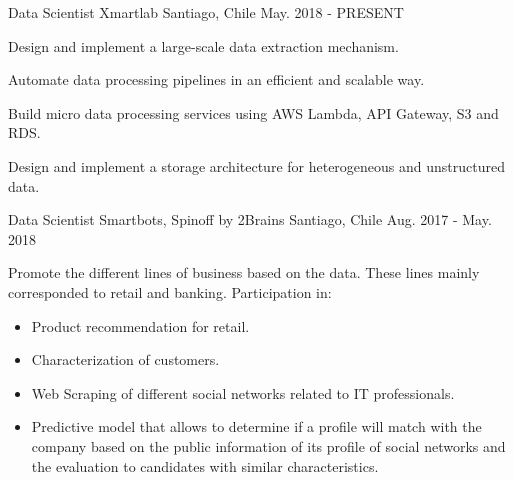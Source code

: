 

\begin{cventries}

  \cventry
    {Data Scientist} %
    {Xmartlab} %
    {Santiago, Chile} %
    {May. 2018 - PRESENT} %
    {
      \begin{cvitems} %
        \item {Design and implement a large-scale data extraction mechanism.}
        \item {Automate data processing pipelines in an efficient and scalable way.}
        \item {Build micro data processing services using AWS Lambda, API Gateway, S3 and RDS.}
        \item {Design and implement a storage architecture for heterogeneous and unstructured data.}
      \end{cvitems}
    }
  \cventry
    {Data Scientist} %
    {Smartbots, Spinoff by 2Brains} %
    {Santiago, Chile} %
    {Aug. 2017 - May. 2018} %
    {
      \begin{cvitems} %
        \item {Promote the different lines of business based on the data. These lines mainly corresponded to retail and banking. Participation in:}
      	\begin{itemize}
        	\item{Product recommendation for retail.}
        	\item{Characterization of customers.}
        	\item{Web Scraping of different social networks related to IT professionals.}
        	\item{Predictive model that allows to determine if a profile will match with the company based on the public information of its profile of social networks and the evaluation to candidates with similar characteristics.}
      	\end{itemize}
      \end{cvitems}
    }


\end{cventries}
